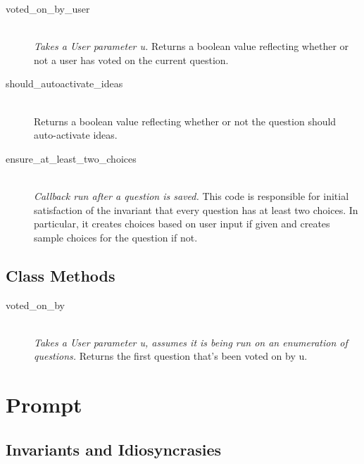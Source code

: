 \documentclass[11pt]{book}
\begin{document}
\begin{description}
  
  \item[voted\_on\_by\_user]  \hfill \\
  \emph{Takes a User parameter u.}  Returns a boolean value reflecting whether or not a user has voted on the current question.
  
  \item[should\_autoactivate\_ideas]  \hfill \\
  \emph{}  Returns a boolean value reflecting whether or not the question should auto-activate ideas.
  
  \item[ensure\_at\_least\_two\_choices]  \hfill \\
  \emph{Callback run after a question is saved.}  This code is responsible for initial satisfaction of the invariant that every question has at least two choices.  In particular, it creates choices based on user input if given and creates sample choices for the question if not.
  
\end{description}  
  
\subsection{Class Methods}

\begin{description}
  
  \item[voted\_on\_by]  \hfill \\
  \emph{Takes a User parameter u, assumes it is being run on an enumeration of questions.}  Returns the first question that's been voted on by u.  
  
\end{description}















\section{Prompt}

\subsection{Invariants and Idiosyncrasies}
\end{document}
